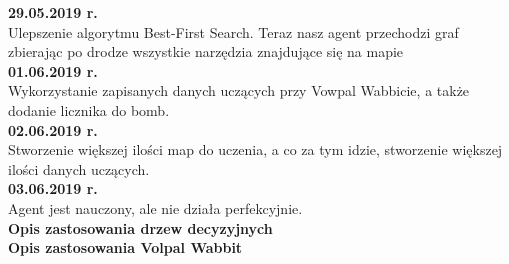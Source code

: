 \documentclass[12pt]{article}
\newcounter{coun}[section]
\begin{document}
\noindent\textbf{29.05.2019 r.}
\setcounter{coun}{0}\\

Ulepszenie algorytmu Best-First Search. Teraz nasz agent przechodzi graf zbierając po drodze wszystkie narzędzia znajdujące się na mapie\\

\noindent\textbf{01.06.2019 r.}
\setcounter{coun}{0}\\

Wykorzystanie zapisanych danych uczących przy Vowpal Wabbicie, a także dodanie licznika do bomb.\\

\noindent\textbf{02.06.2019 r.}
\setcounter{coun}{0}\\

Stworzenie większej ilości map do uczenia, a co za tym idzie, stworzenie większej ilości danych uczących.\\

\noindent\textbf{03.06.2019 r.}
\setcounter{coun}{0}\\

Agent jest nauczony, ale nie działa perfekcyjnie.\\

\noindent \textbf{Opis zastosowania drzew decyzyjnych}\\


\noindent \textbf{Opis zastosowania Volpal Wabbit}\\
\end{document}
